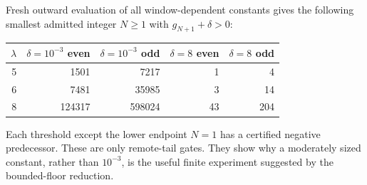 Fresh outward evaluation of all window-dependent constants gives the
following smallest admitted integer $N\ge1$ with $g_{N+1}+\delta>0$:
\begin{center}
\begin{tabular}{rrrrr}
\toprule
$\lambda$ & $\delta=10^{-3}$ even & $\delta=10^{-3}$ odd
 & $\delta=8$ even & $\delta=8$ odd\\
\midrule
5&1501&7217&1&4\\
6&7481&35985&3&14\\
8&124317&598024&43&204\\
\bottomrule
\end{tabular}
\end{center}
Each threshold except the lower endpoint $N=1$ has a certified
negative predecessor. These are only remote-tail gates. They show
why a moderately sized constant, rather than $10^{-3}$, is the useful
finite experiment suggested by the bounded-floor reduction.

